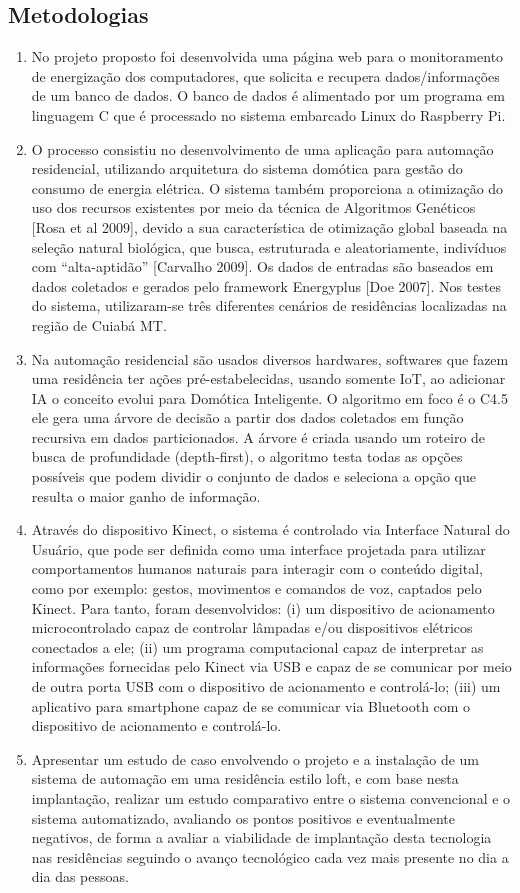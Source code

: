 \documentclass[10pt,brazil,english]{article}
\begin{document}
\subsection{Metodologias}
\begin{enumerate}
\item No projeto proposto foi desenvolvida uma página web para o monitoramento de energização dos computadores, que solicita e recupera dados/informações de um banco de dados. O banco de dados é alimentado por um programa em linguagem C que é processado no sistema embarcado Linux do Raspberry Pi.
\item O processo consistiu no desenvolvimento de uma aplicação para automação residencial, utilizando arquitetura do sistema domótica para gestão do consumo de energia elétrica. O sistema também proporciona a otimização do uso dos recursos existentes por meio da técnica de Algoritmos Genéticos [Rosa et al 2009], devido a sua característica de otimização global baseada na seleção natural biológica, que busca, estruturada e aleatoriamente, indivíduos com “alta-aptidão” [Carvalho 2009]. Os dados de entradas são baseados em dados coletados e gerados pelo framework Energyplus [Doe 2007]. Nos testes do sistema, utilizaram-se três diferentes cenários de residências localizadas na região de Cuiabá MT. 
\item Na automação residencial são usados diversos hardwares, softwares que fazem uma residência ter ações pré-estabelecidas, usando somente IoT, ao adicionar IA o conceito evolui para Domótica Inteligente. O algoritmo em foco é o C4.5 ele gera uma árvore de decisão a partir dos dados coletados em função recursiva em dados particionados. A árvore é criada usando um roteiro de busca de profundidade (depth-first), o algoritmo testa todas as opções possíveis que podem dividir o conjunto de dados e seleciona a opção que resulta o maior ganho de informação. 
\item Através do dispositivo Kinect, o sistema é controlado via Interface Natural do Usuário, que pode ser definida como uma interface projetada para utilizar comportamentos humanos naturais para interagir com o conteúdo digital, como por exemplo: gestos, movimentos e comandos de voz, captados pelo Kinect. Para tanto, foram desenvolvidos: (i) um dispositivo de acionamento microcontrolado capaz de controlar lâmpadas e/ou dispositivos elétricos conectados a ele; (ii) um programa computacional capaz de interpretar as informações fornecidas pelo Kinect via USB e capaz de se comunicar por meio de outra porta USB com o dispositivo de acionamento e controlá-lo; (iii) um aplicativo para smartphone capaz de se comunicar via Bluetooth com o dispositivo de acionamento e controlá-lo. 
\item Apresentar um estudo de caso envolvendo o projeto e a instalação de um sistema de automação em uma residência estilo loft, e com base nesta implantação, realizar um estudo comparativo entre o sistema convencional e o sistema automatizado, avaliando os pontos positivos e eventualmente negativos, de forma a avaliar a viabilidade de implantação desta tecnologia nas residências seguindo o avanço tecnológico cada vez mais presente no dia a dia das pessoas.
\end{enumerate}
\end{document}
